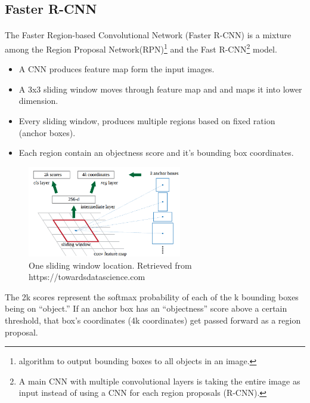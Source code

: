\documentclass[12pt]{report}
\begin{document}
                \subsection{Faster R-CNN}
                \paragraph{}
                The Faster Region-based Convolutional Network (Faster R-CNN) is a  mixture among  
                the Region Proposal Network(RPN)\footnote{algorithm to output bounding boxes to all objects in an image.} 
                and the Fast R-CNN\footnote{A main CNN with multiple convolutional layers is taking the entire image as input instead of using a CNN for each region proposals (R-CNN).} model.
                \begin{itemize}
                \item A CNN produces feature map form the input images.
                \item A 3x3 sliding window moves through feature map and and maps it into lower dimension.
                \item Every sliding window, produces multiple regions based on fixed ration (anchor boxes).
                \item Each region contain an objectness score and it's bounding box coordinates.
                \end{itemize}
                \begin{figure}[h]
                \centering
                \includegraphics[width=0.6\textwidth]{./images/cfm.png}
                \caption{One sliding window location. Retrieved from https://towardsdatascience.com}
                \label{fig:frcnn}
                \end{figure} 
                The 2k scores represent the softmax probability of each of the k bounding boxes being on “object.”
                If an anchor box has an “objectness” score above a certain threshold, that box’s coordinates (4k coordinates) get passed forward as a region proposal.
\end{document}
